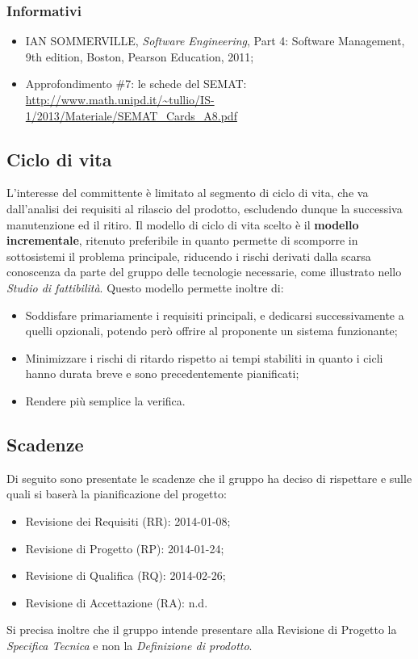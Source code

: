 		\subsubsection{Informativi}
		
		\begin{itemize}
		\item IAN SOMMERVILLE, \textit{Software Engineering}, Part 4: Software Management, 9th edition, Boston, Pearson Education, 2011;
		\item Approfondimento \#7: le schede del SEMAT:\\
			\url{http://www.math.unipd.it/~tullio/IS-1/2013/Materiale/SEMAT_Cards_A8.pdf}
		\end{itemize}
		
	\pagebreak
	\subsection{Ciclo di vita}
	L'interesse del committente è limitato al segmento di ciclo di vita, che va dall'analisi dei requisiti al rilascio del prodotto, escludendo dunque la successiva manutenzione ed il ritiro.
	Il modello di ciclo di vita scelto è il \textbf{modello incrementale}, ritenuto preferibile in quanto permette di scomporre in sottosistemi il problema principale, riducendo i rischi derivati dalla scarsa conoscenza da parte del gruppo delle tecnologie necessarie, come illustrato nello \textit{Studio di fattibilità}.
	Questo modello permette inoltre di:
	\begin{itemize}
	\item Soddisfare primariamente i requisiti principali, e dedicarsi successivamente a quelli opzionali, potendo però offrire al proponente un sistema funzionante;
	\item Minimizzare i rischi di ritardo rispetto ai tempi stabiliti in quanto i cicli hanno durata breve e sono precedentemente pianificati;
	\item Rendere più semplice la verifica.
	\end{itemize}
	\subsection{Scadenze}
	Di seguito sono presentate le scadenze che il gruppo ha deciso di rispettare e sulle quali si baserà la pianificazione del progetto:
	\begin{itemize}
	\item Revisione dei Requisiti (RR): 2014-01-08;
	\item Revisione di Progetto (RP): 2014-01-24;
	\item Revisione di Qualifica (RQ): 2014-02-26;
	\item Revisione di Accettazione (RA): n.d.
	\end{itemize}
	Si precisa inoltre che il gruppo intende presentare alla Revisione di Progetto la \textit{Specifica Tecnica} e non la \textit{Definizione di prodotto}.

